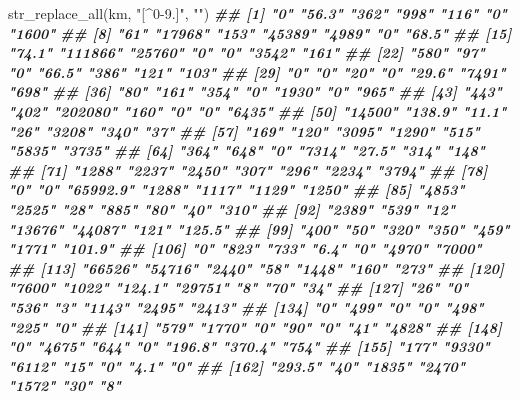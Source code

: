 \documentclass[11pt,german,a4paper]{article}
\newenvironment{Shaded}{\begin{snugshade}}{\end{snugshade}}
\newcommand{\DocumentationTok}[1]{\textcolor[rgb]{0.56,0.35,0.01}{\textbf{\textit{#1}}}}
\newcommand{\FunctionTok}[1]{\textcolor[rgb]{0.00,0.00,0.00}{#1}}
\newcommand{\NormalTok}[1]{#1}
\newcommand{\StringTok}[1]{\textcolor[rgb]{0.31,0.60,0.02}{#1}}
\begin{document}
\begin{Shaded}
\begin{Highlighting}[]
\FunctionTok{str\_replace\_all}\NormalTok{(km, }\StringTok{"[\^{}0{-}9.]"}\NormalTok{, }\StringTok{""}\NormalTok{)}
\DocumentationTok{\#\#   [1] "0"       "56.3"    "362"     "998"     "116"     "0"       "1600"   }
\DocumentationTok{\#\#   [8] "61"      "17968"   "153"     "45389"   "4989"    "0"       "68.5"   }
\DocumentationTok{\#\#  [15] "74.1"    "111866"  "25760"   "0"       "0"       "3542"    "161"    }
\DocumentationTok{\#\#  [22] "580"     "97"      "0"       "66.5"    "386"     "121"     "103"    }
\DocumentationTok{\#\#  [29] "0"       "0"       "20"      "0"       "29.6"    "7491"    "698"    }
\DocumentationTok{\#\#  [36] "80"      "161"     "354"     "0"       "1930"    "0"       "965"    }
\DocumentationTok{\#\#  [43] "443"     "402"     "202080"  "160"     "0"       "0"       "6435"   }
\DocumentationTok{\#\#  [50] "14500"   "138.9"   "11.1"    "26"      "3208"    "340"     "37"     }
\DocumentationTok{\#\#  [57] "169"     "120"     "3095"    "1290"    "515"     "5835"    "3735"   }
\DocumentationTok{\#\#  [64] "364"     "648"     "0"       "7314"    "27.5"    "314"     "148"    }
\DocumentationTok{\#\#  [71] "1288"    "2237"    "2450"    "307"     "296"     "2234"    "3794"   }
\DocumentationTok{\#\#  [78] "0"       "0"       "65992.9" "1288"    "1117"    "1129"    "1250"   }
\DocumentationTok{\#\#  [85] "4853"    "2525"    "28"      "885"     "80"      "40"      "310"    }
\DocumentationTok{\#\#  [92] "2389"    "539"     "12"      "13676"   "44087"   "121"     "125.5"  }
\DocumentationTok{\#\#  [99] "400"     "50"      "320"     "350"     "459"     "1771"    "101.9"  }
\DocumentationTok{\#\# [106] "0"       "823"     "733"     "6.4"     "0"       "4970"    "7000"   }
\DocumentationTok{\#\# [113] "66526"   "54716"   "2440"    "58"      "1448"    "160"     "273"    }
\DocumentationTok{\#\# [120] "7600"    "1022"    "124.1"   "29751"   "8"       "70"      "34"     }
\DocumentationTok{\#\# [127] "26"      "0"       "536"     "3"       "1143"    "2495"    "2413"   }
\DocumentationTok{\#\# [134] "0"       "499"     "0"       "0"       "498"     "225"     "0"      }
\DocumentationTok{\#\# [141] "579"     "1770"    "0"       "90"      "0"       "41"      "4828"   }
\DocumentationTok{\#\# [148] "0"       "4675"    "644"     "0"       "196.8"   "370.4"   "754"    }
\DocumentationTok{\#\# [155] "177"     "9330"    "6112"    "15"      "0"       "4.1"     "0"      }
\DocumentationTok{\#\# [162] "293.5"   "40"      "1835"    "2470"    "1572"    "30"      "8"      }

\end{Highlighting}
\end{Shaded}
\end{document}
